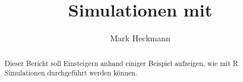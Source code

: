 \documentclass[12pt, a4paper]{article}
\title{Simulationen mit \R{}}
\author{Mark Heckmann}
\newcommand{\R}{{\sffamily R}}
\begin{document}
 
    
\maketitle

\begin{abstract}
Dieser Bericht soll Einsteigern anhand einiger Beispiel aufzeigen, wie mit \R{} Simulationen durchgeführt werden können.
\end{abstract}

\begin{singlespace}
\tableofcontents
\end{singlespace}

\newpage 

\newpage 
   
\newpage
    
\newpage

\newpage 
 
\newpage  
 
\newpage
 
\newpage
 
\newpage
 
\end{document}
